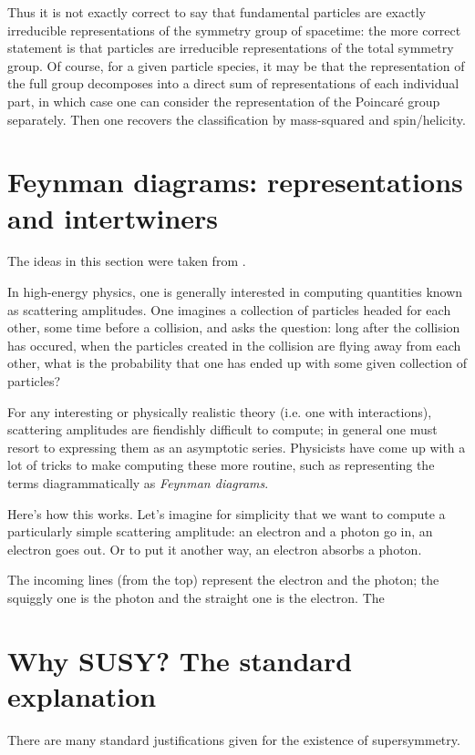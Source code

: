 \documentclass[a4paper]{report}
\theoremstyle{definition}
\theoremstyle{plain}
\theoremstyle{remark}
\begin{document}
Thus it is not exactly correct to say that fundamental particles are exactly irreducible representations of the symmetry group of spacetime: the more correct statement is that particles are irreducible representations of the total symmetry group. Of course, for a given particle species, it may be that the representation of the full group decomposes into a direct sum of representations of each individual part, in which case one can consider the representation of the Poincar\'{e} group separately. Then one recovers the classification by mass-squared and spin/helicity.

\section{Feynman diagrams: representations and intertwiners}
The ideas in this section were taken from \cite{baez-lauda-prehistory}.

In high-energy physics, one is generally interested in computing quantities known as scattering amplitudes. One imagines a collection of particles headed for each other, some time before a collision, and asks the question: long after the collision has occured, when the particles created in the collision are flying away from each other, what is the probability that one has ended up with some given collection of particles? 

For any interesting or physically realistic theory (i.e. one with interactions), scattering amplitudes are fiendishly difficult to compute; in general one must resort to expressing them as an asymptotic series. Physicists have come up with a lot of tricks to make computing these more routine, such as representing the terms diagrammatically as \emph{Feynman diagrams}.

Here's how this works. Let's imagine for simplicity that we want to compute a particularly simple scattering amplitude: an electron and a photon go in, an electron goes out. Or to put it another way, an electron absorbs a photon.

The incoming lines (from the top) represent the electron and the photon; the squiggly one is the photon and the straight one is the electron. The 


\section{Why SUSY? The standard explanation}
There are many standard justifications given for the existence of supersymmetry. 
\end{document}
